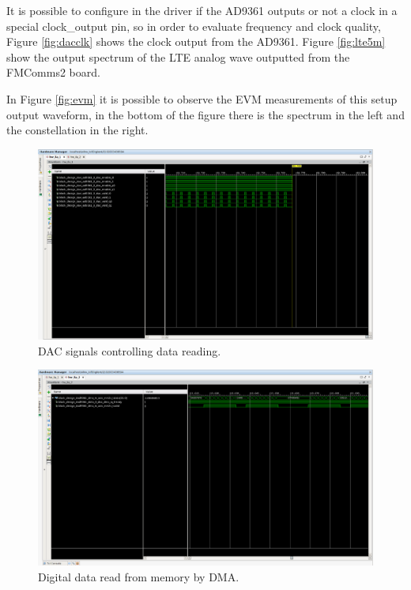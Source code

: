 It is possible to configure in the driver if the AD9361 outputs or not a clock
in a special clock\_output pin, so in order to evaluate frequency and clock
quality, Figure \ref{fig:dacclk} shows the clock output from the AD9361. Figure
\ref{fig:lte5m} show the output spectrum of the LTE analog wave outputted from
the FMComms2 board.

In Figure \ref{fig:evm} it is possible to observe the EVM measurements of this
setup output waveform, in the bottom of the figure there is the spectrum in the
left and the constellation in the right.

\begin{figure}[htbp]
    \centering
    \includegraphics[width=1\textwidth,
    trim={{.15\textwidth} {1.2\textwidth} {.7\textwidth} {.16\textwidth}},
    clip]{./figures/dac_signals}
    \caption{ DAC signals controlling data reading.
    \label{fig:dacsignals}}
\end{figure}

\begin{figure}[htbp]
    \centering
    \includegraphics[width=1\textwidth,
    trim={{.15\textwidth} {1.3\textwidth} {.05\textwidth} {.16\textwidth}},
    clip]{./figures/ila_dataflow}
    \caption{ Digital data read from memory by DMA.
    \label{fig:dataflowdig}}
\end{figure}

